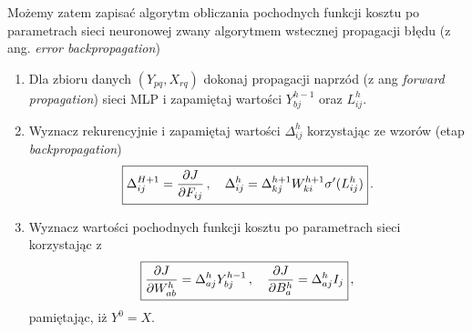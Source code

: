 \documentclass{myclass}
\begin{document}
Możemy zatem zapisać algorytm obliczania pochodnych funkcji kosztu po parametrach sieci neuronowej
zwany algorytmem wstecznej propagacji błędu (z ang. \textit{error backpropagation})

\begin{tcolorbox}[title=Algorytm wstecznej propagacji błędu]
    \begin{enumerate}
        \item Dla zbioru danych \((Y_{pq}, X_{rq})\) dokonaj propagacji naprzód (z ang
        \textit{forward propagation}) sieci MLP i zapamiętaj wartości \(Y_{bj}^{h-1}\) oraz
        \(L_{ij}^h\).

        \item Wyznacz rekurencyjnie i zapamiętaj wartości \(\Delta_{ij}^h\) korzystając ze wzorów
        (etap \textit{backpropagation})
        \begin{equation*}
            \boxed{\Delta_{ij}^{H+1} = \pdv{J}{F_{ij}}\,,\quad \Delta_{ij}^h = \Delta_{kj}^{h+1}W_{ki}^{h+1}\sigma'(L_{ij}^h)}\,.
        \end{equation*}

        \item Wyznacz wartości pochodnych funkcji kosztu po parametrach sieci korzystając z
        \begin{equation*}
            \boxed{\pdv{J}{W_{ab}^h} = \Delta_{aj}^h Y_{bj}^{h-1}\,,\quad \pdv{J}{B_a^h} = \Delta_{aj}^hI_j}\,,
        \end{equation*}
        pamiętając, iż \(Y^0 = X\).
    \end{enumerate}
\end{tcolorbox}
\end{document}
